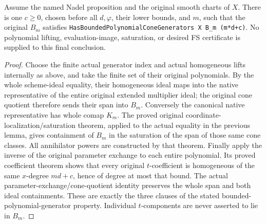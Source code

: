 \begin{proposition}
\label{prop:c0n-original-bounded-polynomial-cone-generators}
\leanok
Assume the named Nadel proposition and the original smooth charts of $X$.
There is one $c\geq0$, chosen before all $d,\varphi$, their lower bounds,
and $m$, such that the original $B_m$ satisfies
\nolinkurl{HasBoundedPolynomialConeGenerators X B_m (m*d+c)}.
No polynomial lifting, evaluation-image, saturation, or desired FS
certificate is supplied to this final conclusion.
\end{proposition}
\begin{proof}
Choose the finite actual generator index and actual homogeneous lifts
internally as above, and take the finite set of their original polynomials.
By the whole scheme-ideal equality, their homogeneous ideal maps into the
native representative of the entire original extended multiplier ideal;
the original cone quotient therefore sends their span into $B_m$.
Conversely the canonical native representative has whole comap $K_m$.
The proved original coordinate-localization/saturation theorem, applied
to the actual equality in the previous lemma, gives containment of $B_m$
in the saturation of the span of those same cone classes.  All annihilator
powers are constructed by that theorem.  Finally apply the inverse of
the original parameter exchange to each entire polynomial.  Its proved
coefficient theorem shows that every original $t$-coefficient is
homogeneous of the same $x$-degree $md+c$, hence of degree at most that
bound.  The actual parameter-exchange/cone-quotient identity preserves
the whole span and both ideal containments.  These are exactly the three
clauses of the stated bounded-polynomial-generator property.  Individual
$t$-components are never asserted to lie in $B_m$.
\end{proof}
